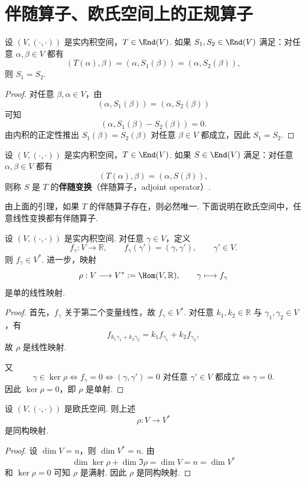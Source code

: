 \section{伴随算子、欧氏空间上的正规算子}



\begin{lemma}
	设 $(V,(\cdot,\cdot))$ 是实内积空间，$T\in\End(V)$. 如果 $S_1,S_2\in\End(V)$ 满足：对任意 $\alpha,\beta\in V$ 都有
	\[
	(T(\alpha),\beta)=(\alpha,S_1(\beta))=(\alpha,S_2(\beta)),
	\]
	则 $S_1=S_2$.
\end{lemma}
\begin{proof}
	对任意 $\beta,\alpha\in V$，由
	\[
	(\alpha,S_1(\beta))=(\alpha,S_2(\beta))
	\]
	可知
	\[
	(\alpha,S_1(\beta)-S_2(\beta))=0.
	\]
	由内积的正定性推出 $S_1(\beta)=S_2(\beta)$ 对任意 $\beta\in V$ 都成立，因此 $S_1=S_2$.
\end{proof}

\begin{definition}\label{p1:concept:c6-l2084}
	设 $(V,(\cdot,\cdot))$ 是实内积空间，$T\in\End(V)$. 如果 $S\in\End(V)$ 满足：对任意 $\alpha,\beta\in V$ 都有
	\[
	(T(\alpha),\beta)=(\alpha,S(\beta)),
	\]
	则称 $S$ 是 $T$ 的\textbf{伴随变换}（伴随算子，adjoint operator）.
\end{definition}

由上面的引理，如果 $T$ 的伴随算子存在，则必然唯一. 下面说明在欧氏空间中，任意线性变换都有伴随算子.

\begin{lemma}
	设 $(V,(\cdot,\cdot))$ 是实内积空间. 对任意 $\gamma\in V$，定义
	\[
	f_\gamma:V\longrightarrow\mathbb{R},
	\qquad
	f_\gamma(\gamma')=(\gamma,\gamma'),
	\qquad \gamma'\in V.
	\]
	则 $f_\gamma\in V^*$. 进一步，映射
	\[
	\rho:V\longrightarrow V^*:=\Hom(V,\mathbb{R}),
	\qquad
	\gamma\longmapsto f_\gamma
	\]
	是单的线性映射.
\end{lemma}
\begin{proof}
	首先，$f_\gamma$ 关于第二个变量线性，故 $f_\gamma\in V^*$. 对任意 $k_1,k_2\in\mathbb{R}$ 与 $\gamma_1,\gamma_2\in V$，有
	\[
	f_{k_1\gamma_1+k_2\gamma_2}=k_1f_{\gamma_1}+k_2f_{\gamma_2},
	\]
	故 $\rho$ 是线性映射.
	
	又
	\[
	\gamma\in\ker\rho
	\Longleftrightarrow f_\gamma=0
	\Longleftrightarrow (\gamma,\gamma')=0\text{ 对任意 }\gamma'\in V\text{ 都成立}
	\Longleftrightarrow \gamma=0.
	\]
	因此 $\ker\rho=0$，即 $\rho$ 是单射.
\end{proof}

\begin{corollary}
	设 $(V,(\cdot,\cdot))$ 是欧氏空间. 则上述
	\[
	\rho:V\longrightarrow V^*
	\]
	是同构映射.
\end{corollary}
\begin{proof}
	设 $\dim V=n$，则 $\dim V^*=n$. 由
	\[
	\dim\ker\rho+\dim\Im \rho=\dim V=n=\dim V^*
	\]
	和 $\ker\rho=0$ 可知 $\rho$ 是满射. 因此 $\rho$ 是同构映射.
\end{proof}

